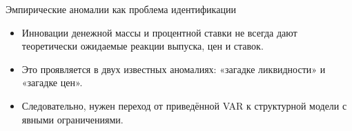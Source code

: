 \begin{frame}{Эмпирические аномалии как проблема идентификации}
\small
\begin{itemize}
\setlength\itemsep{0.5em}
\item Инновации денежной массы и процентной ставки не всегда дают теоретически ожидаемые реакции выпуска, цен и ставок.
\item Это проявляется в двух известных аномалиях: «загадке ликвидности» и «загадке цен».
\item Следовательно, нужен переход от приведённой VAR к структурной модели с явными ограничениями.
\end{itemize}
\end{frame}